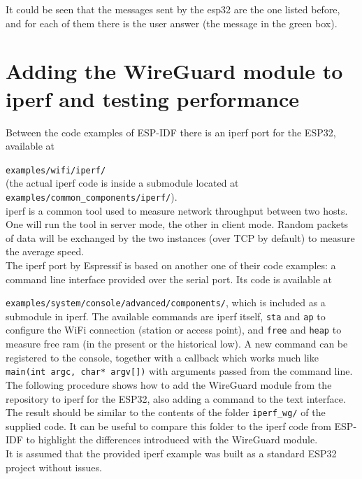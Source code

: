 It could be seen that the messages sent by the esp32 are the one listed before, and for each of them there is the user answer (the message in the green box).\\


\section{Adding the WireGuard module to iperf and testing performance}\label{sec:iperf_wg}

Between the code examples of ESP-IDF there is an iperf port for the ESP32, available at

\texttt{examples/wifi/iperf/}\\(the actual iperf code is inside a submodule located at \texttt{examples/common\_components/iperf/}).\\
iperf is a common tool used to measure network throughput between two hosts. One will run the tool in server mode, the other in client mode. Random packets of data will be exchanged by the two instances (over TCP by default) to measure the average speed.\\
The iperf port by Espressif is based on another one of their code examples: a command line interface provided over the serial port. Its code is available at

\texttt{examples/system/console/advanced/components/}, which is included as a submodule in iperf. The available commands are iperf itself, \texttt{sta} and \texttt{ap} to configure the WiFi connection (station or access point), and \texttt{free} and \texttt{heap} to measure free ram (in the present or the historical low). A new command can be registered to the console, together with a callback which works much like \texttt{main(int argc, char* argv[])} with arguments passed from the command line.\\
The following procedure shows how to add the WireGuard module from the repository \cite{wg_trombik} to iperf for the ESP32, also adding a command to the text interface.\\
The result should be similar to the contents of the folder \texttt{iperf\_wg/} of the supplied code. It can be useful to compare this folder to the iperf code from ESP-IDF to highlight the differences introduced with the WireGuard module.\\
It is assumed that the provided iperf example was built as a standard ESP32 project without issues.

